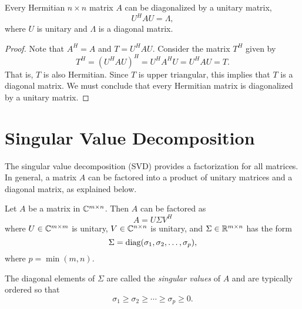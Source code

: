 \begin{theorem} \label{theorem:HermitanDiagonalizable}
Every Hermitian $n \times n$ matrix $A$ can be diagonalized by a unitary matrix,
\begin{equation*}
U^H A U = \Lambda,
\end{equation*}
where $U$ is unitary and $\Lambda$ is a diagonal matrix.
\end{theorem}

\begin{proof}
Note that $A^H = A$ and $T = U^H A U$.
Consider the matrix $T^H$ given by
\begin{equation*}
T^H = (U^H A U)^H = U^H A^H U = U^H A U = T.
\end{equation*}
That is, $T$ is also Hermitian.
Since $T$ is upper triangular, this implies that $T$ is a diagonal matrix.
We must conclude that every Hermitian matrix is diagonalized by a unitary matrix.
\end{proof}


\section{Singular Value Decomposition}

The singular value decomposition (SVD) provides a factorization for all matrices.
In general, a matrix $A$ can be factored into a product of unitary matrices and a diagonal matrix, as explained below.

\begin{theorem}
Let $A$ be a matrix in $\mathbb{C}^{m \times n}$.
Then $A$ can be factored as
\begin{equation*}
A = U \Sigma V^H
\end{equation*}
where $U \in \mathbb{C}^{m \times m}$ is unitary, $V \in \mathbb{C}^{n \times n}$ is unitary, and $\Sigma \in \mathbb{R}^{m \times n}$ has the form
\begin{equation*}
\Sigma = \mathrm{diag} ( \sigma_1, \sigma_2, \ldots, \sigma_p ),
\end{equation*}
where $p = \min (m,n)$.
\end{theorem}

The diagonal elements of $\Sigma$ are called the \emph{singular values} of $A$ and are typically ordered so that
\begin{equation*}
\sigma_1 \geq \sigma_2 \geq \cdots \geq \sigma_p \geq 0.
\end{equation*}

